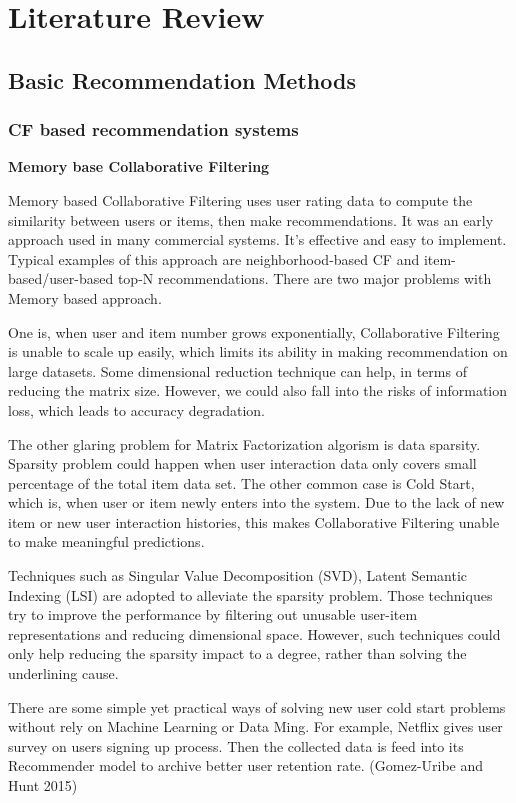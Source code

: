 \section{Literature Review}

\subsection{Basic Recommendation Methods}

\bigskip
\subsubsection{CF based recommendation systems}

\bigskip
\textbf{Memory base Collaborative Filtering}

Memory based Collaborative Filtering uses user rating data to compute the similarity between users or items, then make recommendations. It was an early approach used in many commercial systems. It's effective and easy to implement. Typical examples of this approach are neighborhood-based CF and item-based/user-based top-N recommendations. There are two major problems with Memory based approach.  

One is, when user and item number grows exponentially, Collaborative Filtering is unable to scale up easily, which limits its ability in making recommendation on large datasets. Some dimensional reduction technique can help, in terms of reducing the matrix size. However, we could also fall into the risks of information loss, which leads to accuracy degradation.  

The other glaring problem for Matrix Factorization algorism is data sparsity. Sparsity problem could happen when user interaction data only covers small percentage of the total item data set. The other common case is Cold Start, which is, when user or item newly enters into the system. Due to the lack of new item or new user interaction histories, this makes Collaborative Filtering unable to make meaningful predictions.  

Techniques such as Singular Value Decomposition (SVD), Latent Semantic Indexing (LSI) are adopted to alleviate the sparsity problem. Those techniques try to improve the performance by filtering out unusable user-item representations and reducing dimensional space. However, such techniques could only help reducing the sparsity impact to a degree, rather than solving the underlining cause. 

There are some simple yet practical ways of solving new user cold start problems without rely on Machine Learning or Data Ming. For example, Netflix gives user survey on users signing up process. Then the collected data is feed into its Recommender model to archive better user retention rate. (Gomez-Uribe and Hunt 2015) 


